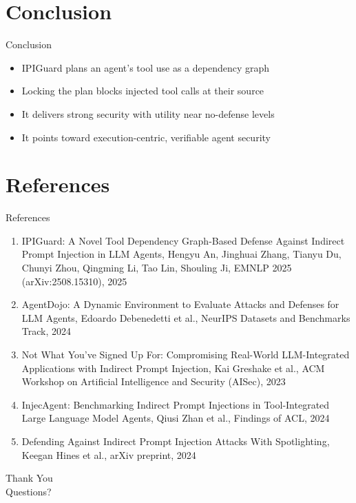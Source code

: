 \documentclass[10pt]{beamer}
\begin{document}
\section{Conclusion}
\begin{frame}{Conclusion}
\begin{itemize}
  \item IPIGuard plans an agent's tool use as a dependency graph
  \item Locking the plan blocks injected tool calls at their source
  \item It delivers strong security with utility near no-defense levels
  \item It points toward execution-centric, verifiable agent security
\end{itemize}
\end{frame}

\section{References}
\begin{frame}[allowframebreaks]{References}
  \footnotesize
  \begin{enumerate}
    \item IPIGuard: A Novel Tool Dependency Graph-Based Defense Against Indirect Prompt Injection in LLM Agents, Hengyu An, Jinghuai Zhang, Tianyu Du, Chunyi Zhou, Qingming Li, Tao Lin, Shouling Ji, EMNLP 2025 (arXiv:2508.15310), 2025
    \item AgentDojo: A Dynamic Environment to Evaluate Attacks and Defenses for LLM Agents, Edoardo Debenedetti et al., NeurIPS Datasets and Benchmarks Track, 2024
    \item Not What You've Signed Up For: Compromising Real-World LLM-Integrated Applications with Indirect Prompt Injection, Kai Greshake et al., ACM Workshop on Artificial Intelligence and Security (AISec), 2023
    \item InjecAgent: Benchmarking Indirect Prompt Injections in Tool-Integrated Large Language Model Agents, Qiusi Zhan et al., Findings of ACL, 2024
    \item Defending Against Indirect Prompt Injection Attacks With Spotlighting, Keegan Hines et al., arXiv preprint, 2024
  \end{enumerate}
\end{frame}

\begin{frame}[plain]
  \begin{center}
    {\Huge Thank You}\\[1em]
    {\large Questions?}
  \end{center}
\end{frame}
\end{document}
